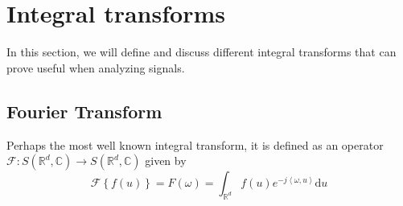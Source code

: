 \documentclass[12pt]{article}
\newcommand{\dd}{\mathrm{d}}
\begin{document}

\newpage
\section{Integral transforms}
In this section, we will define and discuss different integral transforms that can prove useful when analyzing signals.

\subsection{Fourier Transform}
Perhaps the most well known integral transform, it is defined as an operator $\mathcal{F}: S\left (\mathbb{R}^d, \mathbb{C}\right )\rightarrow S\left (\mathbb{R}^d, \mathbb{C}\right )$ given by
\begin{equation}
\mathcal{F}\left \{f(u)\right \} = F(\omega) = \int_{\mathbb{R}^d}f(u)e^{-j\left <\omega, u\right >}\dd u
\end{equation}

\end{document}
